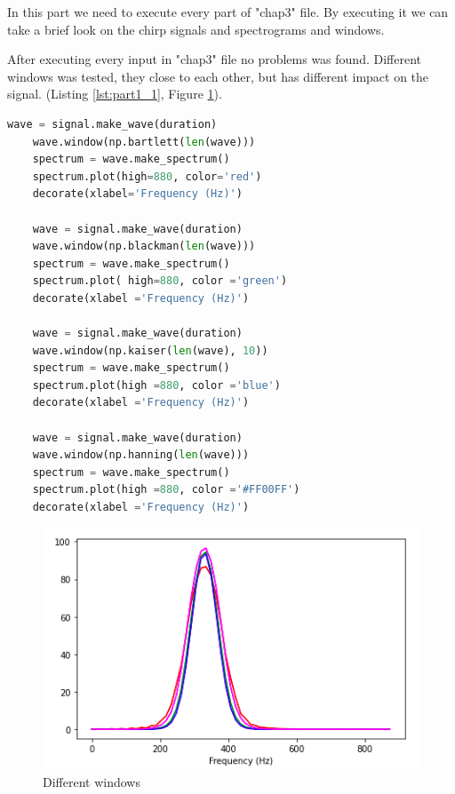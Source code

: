 \documentclass[a4paper]{article}
\begin{document}
        In this part we need to execute every part of "chap3" file. By executing it we can take a brief look on the chirp signals and spectrograms and windows.
        
        After executing every input in "chap3" file no problems was found. Different windows was tested, they close to each other, but has different impact on the signal. (Listing \ref{lst:part1_1}, Figure \ref{fig:work_check}).
        
        \begin{lstlisting}[language=Python,caption=Windows computation,label={lst:part1_1}]
    wave = signal.make_wave(duration)
    wave.window(np.bartlett(len(wave)))
    spectrum = wave.make_spectrum()
    spectrum.plot(high=880, color='red')
    decorate(xlabel='Frequency (Hz)')
    
    wave = signal.make_wave(duration)
    wave.window(np.blackman(len(wave)))
    spectrum = wave.make_spectrum()
    spectrum.plot( high=880, color ='green')
    decorate(xlabel ='Frequency (Hz)')
    
    wave = signal.make_wave(duration)
    wave.window(np.kaiser(len(wave), 10))
    spectrum = wave.make_spectrum()
    spectrum.plot(high =880, color ='blue')
    decorate(xlabel ='Frequency (Hz)')
    
    wave = signal.make_wave(duration)
    wave.window(np.hanning(len(wave)))
    spectrum = wave.make_spectrum()
    spectrum.plot(high =880, color ='#FF00FF')
    decorate(xlabel ='Frequency (Hz)')
        \end{lstlisting}
        
        \begin{figure}[h]
            \centering
            \includegraphics[width=\textwidth]{img/yotsunomado.png}
            \caption{Different windows}
            \label{fig:work_check}
        \end{figure}
    
\end{document}
